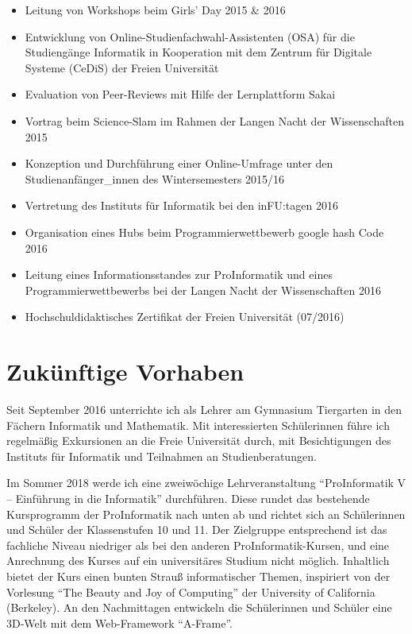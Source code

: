 \documentclass[11pt,ngerman]{article}
\begin{document}
\begin{itemize}
\item Leitung von Workshops beim Girls' Day 2015 \& 2016
\item Entwicklung von Online-Studienfachwahl-Assistenten (OSA) für die Studiengänge Informatik in Kooperation mit dem Zentrum für Digitale Systeme (CeDiS) der Freien Universität
\item Evaluation von Peer-Reviews mit Hilfe der Lernplattform Sakai
\item Vortrag beim Science-Slam im Rahmen der Langen Nacht der Wissenschaften 2015
\item Konzeption und Durchführung einer Online-Umfrage unter den Studienanfänger\_innen des Wintersemesters 2015/16
\item Vertretung des Instituts für Informatik bei den inFU:tagen 2016
\item Organisation eines Hubs beim Programmierwettbewerb google hash Code 2016
\item Leitung eines Informationsstandes zur ProInformatik und eines Programmierwettbewerbs bei der Langen Nacht der Wissenschaften 2016
\item Hochschuldidaktisches Zertifikat der Freien Universität (07/2016)
\end{itemize}

\section{Zukünftige Vorhaben}

Seit September 2016 unterrichte ich als Lehrer am Gymnasium Tiergarten in den Fächern Informatik und Mathematik. Mit interessierten Schülerinnen führe ich regelmäßig Exkursionen an die Freie Universität durch, mit Besichtigungen des Instituts für Informatik und Teilnahmen an Studienberatungen. 

Im Sommer 2018 werde ich eine zweiwöchige Lehrveranstaltung ``ProInformatik V -- Einführung in die Informatik'' durchführen. Diese rundet das bestehende Kursprogramm der ProInformatik nach unten ab und richtet sich an Schülerinnen und Schüler der Klassenstufen 10 und 11. Der Zielgruppe entsprechend ist das fachliche Niveau niedriger als bei den anderen ProInformatik-Kursen, und eine Anrechnung des Kurses auf ein universitäres Studium nicht möglich. Inhaltlich bietet der Kurs einen bunten Strauß informatischer Themen, inspiriert von der Vorlesung ``The Beauty and Joy of Computing'' der University of California (Berkeley). An den Nachmittagen entwickeln die Schülerinnen und Schüler eine 3D-Welt mit dem Web-Framework ``A-Frame''.
\end{document}
